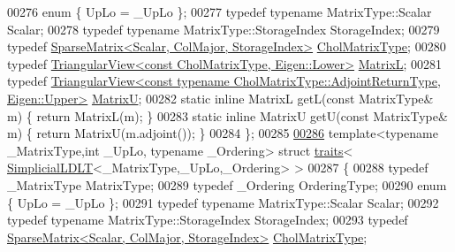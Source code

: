 \begin{DoxyCode}
00276   \textcolor{keyword}{enum} \{ UpLo = \_UpLo \};
00277   \textcolor{keyword}{typedef} \textcolor{keyword}{typename} MatrixType::Scalar                         Scalar;
00278   \textcolor{keyword}{typedef} \textcolor{keyword}{typename} MatrixType::StorageIndex                   StorageIndex;
00279   \textcolor{keyword}{typedef} \hyperlink{group___sparse_core___module}{SparseMatrix<Scalar, ColMajor, StorageIndex>}        
      \hyperlink{group___sparse_core___module}{CholMatrixType};
00280   \textcolor{keyword}{typedef} \hyperlink{group___core___module_class_eigen_1_1_triangular_view}{TriangularView<const CholMatrixType, Eigen::Lower>}
        \hyperlink{group___core___module_class_eigen_1_1_triangular_view}{MatrixL};
00281   \textcolor{keyword}{typedef} 
      \hyperlink{group___core___module_class_eigen_1_1_triangular_view}{TriangularView<const typename CholMatrixType::AdjointReturnType, Eigen::Upper>}
         \hyperlink{group___core___module_class_eigen_1_1_triangular_view}{MatrixU};
00282   \textcolor{keyword}{static} \textcolor{keyword}{inline} MatrixL getL(\textcolor{keyword}{const} MatrixType& m) \{ \textcolor{keywordflow}{return} MatrixL(m); \}
00283   \textcolor{keyword}{static} \textcolor{keyword}{inline} MatrixU getU(\textcolor{keyword}{const} MatrixType& m) \{ \textcolor{keywordflow}{return} MatrixU(m.adjoint()); \}
00284 \};
00285 
\hyperlink{struct_eigen_1_1internal_1_1traits_3_01_simplicial_l_d_l_t_3_01___matrix_type_00_01___up_lo_00_01___ordering_01_4_01_4}{00286} \textcolor{keyword}{template}<\textcolor{keyword}{typename} \_MatrixType,\textcolor{keywordtype}{int} \_UpLo, \textcolor{keyword}{typename} \_Ordering> \textcolor{keyword}{struct }\hyperlink{struct_eigen_1_1internal_1_1traits}{traits}<
      \hyperlink{group___sparse_cholesky___module_class_eigen_1_1_simplicial_l_d_l_t}{SimplicialLDLT}<\_MatrixType,\_UpLo,\_Ordering> >
00287 \{
00288   \textcolor{keyword}{typedef} \_MatrixType MatrixType;
00289   \textcolor{keyword}{typedef} \_Ordering OrderingType;
00290   \textcolor{keyword}{enum} \{ UpLo = \_UpLo \};
00291   \textcolor{keyword}{typedef} \textcolor{keyword}{typename} MatrixType::Scalar                             Scalar;
00292   \textcolor{keyword}{typedef} \textcolor{keyword}{typename} MatrixType::StorageIndex                       StorageIndex;
00293   \textcolor{keyword}{typedef} \hyperlink{group___sparse_core___module}{SparseMatrix<Scalar, ColMajor, StorageIndex>}         
         \hyperlink{group___sparse_core___module}{CholMatrixType};

\end{DoxyCode}
